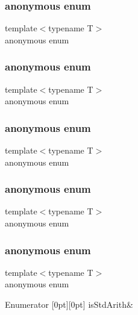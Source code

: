 \subsubsection{\texorpdfstring{anonymous enum}{anonymous enum}}
{\footnotesize\ttfamily template$<$typename T$>$ \\
anonymous enum}

\mbox{\label{classUtil_1_1TypeTraits_ac0aa2e6981457a1212416a322aa33e6b}} 
\subsubsection{\texorpdfstring{anonymous enum}{anonymous enum}}
{\footnotesize\ttfamily template$<$typename T$>$ \\
anonymous enum}

\mbox{\label{classUtil_1_1TypeTraits_ab36b0074c25b9624a563fb80ba54d324}} 
\subsubsection{\texorpdfstring{anonymous enum}{anonymous enum}}
{\footnotesize\ttfamily template$<$typename T$>$ \\
anonymous enum}

\mbox{\label{classUtil_1_1TypeTraits_aee28a16b3a628c8e10b95f6827ff77c7}} 
\subsubsection{\texorpdfstring{anonymous enum}{anonymous enum}}
{\footnotesize\ttfamily template$<$typename T$>$ \\
anonymous enum}

\mbox{\label{classUtil_1_1TypeTraits_ac7d66b692de66a220c7988bb3aaffa3f}} 
\subsubsection{\texorpdfstring{anonymous enum}{anonymous enum}}
{\footnotesize\ttfamily template$<$typename T$>$ \\
anonymous enum}

\begin{DoxyEnumFields}{Enumerator}
[0pt][0pt]{}\mbox{\label{classUtil_1_1TypeTraits_a1cfd1423cce5a0b762ee8f5c9c2f004ea3017f19abc6084d7e144891aaf5adb0f}} 
is\+Std\+Arith&\\
\hline

\end{DoxyEnumFields}
\mbox{\label{classUtil_1_1TypeTraits_ab933ddaedc99d5b5402782ebc701cd94}} 
